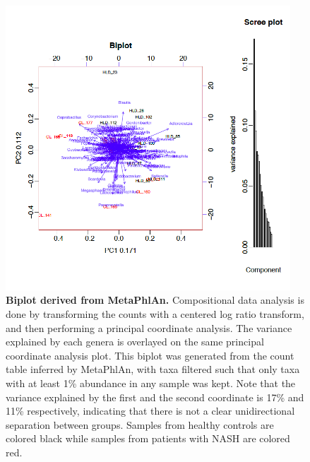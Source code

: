 \begin{figure}[h]
\begin{center}
\includegraphics[width=0.95\textwidth]{metaphlan_biplot.png}
\caption{\textbf{Biplot derived from MetaPhlAn.} Compositional data analysis is done by transforming the counts with a centered log ratio transform, and then performing a principal coordinate analysis. The variance explained by each genera is overlayed on the same principal coordinate analysis plot. This biplot was generated from the count table inferred by MetaPhlAn, with taxa filtered such that only taxa with at least 1\% abundance in any sample was kept. Note that the variance explained by the first and the second coordinate is 17\% and 11\% respectively, indicating that there is not a clear unidirectional separation between groups. Samples from healthy controls are colored black while samples from patients with NASH are colored red.}
\end{center}
\label{nafld_metaphlan_biplot}
\end{figure}

